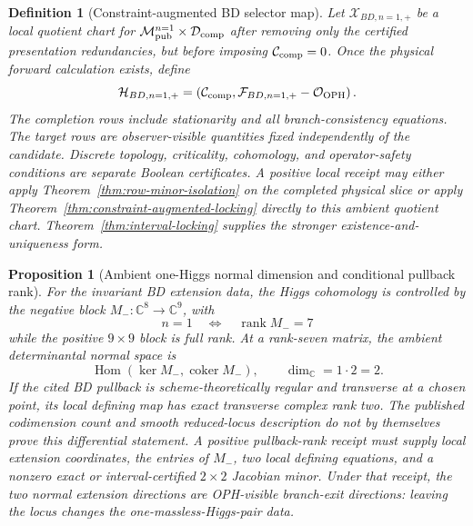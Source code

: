 \documentclass[11pt]{article}
\newtheorem{proposition}[theorem]{Proposition}
\newtheorem{definition}[theorem]{Definition}
\theoremstyle{remark}
\theoremstyle{plain}
\newcommand{\OPH}{\mathrm{OPH}}
\newcommand{\calF}{\mathcal F}
\newcommand{\calO}{\mathcal O}
\begin{document}
\begin{definition}[Constraint-augmented BD selector map]
\label{def:bd-augmented-map}
Let \(\mathcal X_{BD,n=1,+}\) be a local quotient chart for
\(\mathcal M_{\rm pub}^{n=1}\times\mathcal D_{\rm comp}\) after removing only the certified
presentation redundancies, but before imposing \(\mathcal C_{\rm comp}=0\). Once the physical
forward calculation exists, define
\[
\mathcal H_{BD,n=1,+}
=
\left(
\mathcal C_{\rm comp},
\calF_{BD,n=1,+}-\calO_{\OPH}
\right).
\]
The completion rows include stationarity and all branch-consistency equations. The target rows are
observer-visible quantities fixed independently of the candidate. Discrete topology, criticality,
cohomology, and operator-safety conditions are separate Boolean certificates. A positive local
receipt may either apply Theorem~\ref{thm:row-minor-isolation} on the completed physical slice or
apply Theorem~\ref{thm:constraint-augmented-locking} directly to this ambient quotient chart.
Theorem~\ref{thm:interval-locking} supplies the stronger existence-and-uniqueness form.
\end{definition}

\begin{proposition}[Ambient one-Higgs normal dimension and conditional pullback rank]
\label{prop:bd-one-higgs-rank}
For the invariant BD extension data, the Higgs cohomology is controlled by the negative block
\(M_-:\mathbb C^8\to\mathbb C^9\), with
\[
n=1\quad\Longleftrightarrow\quad \operatorname{rank}M_-=7
\]
while the positive \(9\times9\) block is full rank. At a rank-seven matrix, the ambient
determinantal normal space is
\[
\operatorname{Hom}(\ker M_-,\operatorname{coker}M_-),
\qquad
\dim_{\mathbb C}=1\cdot2=2.
\]
If the cited BD pullback is scheme-theoretically regular and transverse at a chosen point, its
local defining map has exact transverse complex rank two. The published codimension count and
smooth reduced-locus description do not by themselves prove this differential statement. A
positive pullback-rank receipt must supply local extension coordinates, the entries of \(M_-\),
two local defining equations, and a nonzero exact or interval-certified \(2\times2\) Jacobian
minor. Under that receipt, the two normal extension directions are OPH-visible branch-exit
directions: leaving the locus changes the one-massless-Higgs-pair data.
\end{proposition}
\end{document}
